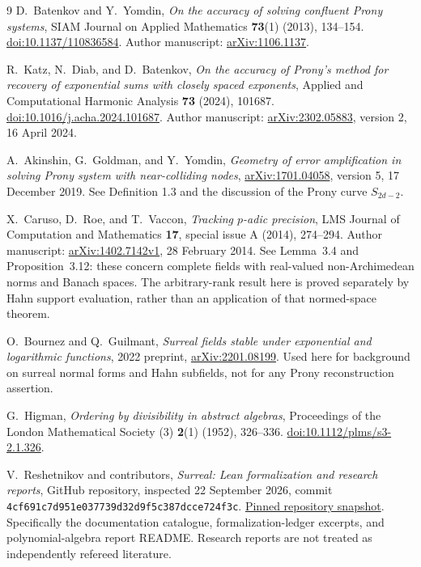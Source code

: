 \documentclass[11pt,letterpaper]{article}
\theoremstyle{definition}
\theoremstyle{remark}
\begin{document}
\begin{thebibliography}{9}
D.~Batenkov and Y.~Yomdin,
\emph{On the accuracy of solving confluent Prony systems},
SIAM Journal on Applied Mathematics \textbf{73}(1) (2013), 134--154.
\href{https://doi.org/10.1137/110836584}{doi:10.1137/110836584}.
Author manuscript: \href{https://arxiv.org/abs/1106.1137}{arXiv:1106.1137}.

R.~Katz, N.~Diab, and D.~Batenkov,
\emph{On the accuracy of Prony's method for recovery of exponential sums
with closely spaced exponents},
Applied and Computational Harmonic Analysis \textbf{73} (2024), 101687.
\href{https://doi.org/10.1016/j.acha.2024.101687}{doi:10.1016/j.acha.2024.101687}.
Author manuscript: \href{https://arxiv.org/abs/2302.05883}{arXiv:2302.05883},
version 2, 16 April 2024.


A.~Akinshin, G.~Goldman, and Y.~Yomdin,
\emph{Geometry of error amplification in solving Prony system with
near-colliding nodes},
\href{https://arxiv.org/abs/1701.04058}{arXiv:1701.04058}, version 5,
17 December 2019. See Definition 1.3 and the discussion of the Prony curve
$S_{2d-2}$.

X.~Caruso, D.~Roe, and T.~Vaccon,
\emph{Tracking $p$-adic precision},
LMS Journal of Computation and Mathematics \textbf{17}, special issue A
(2014), 274--294.
Author manuscript: \href{https://arxiv.org/abs/1402.7142v1}{arXiv:1402.7142v1},
28 February 2014. See Lemma~3.4 and Proposition~3.12: these concern
complete fields with real-valued non-Archimedean norms and Banach spaces.
The arbitrary-rank result here is proved separately by Hahn support
evaluation, rather than an application of that normed-space theorem.

O.~Bournez and Q.~Guilmant,
\emph{Surreal fields stable under exponential and logarithmic functions},
2022 preprint, \href{https://arxiv.org/abs/2201.08199}{arXiv:2201.08199}.
Used here for background on surreal normal forms and Hahn subfields,
not for any Prony reconstruction assertion.

G.~Higman,
\emph{Ordering by divisibility in abstract algebras},
Proceedings of the London Mathematical Society (3) \textbf{2}(1)
(1952), 326--336.
\href{https://doi.org/10.1112/plms/s3-2.1.326}{doi:10.1112/plms/s3-2.1.326}.

V.~Reshetnikov and contributors,
\emph{Surreal: Lean formalization and research reports}, GitHub repository,
inspected 22 September 2026, commit
\texttt{4cf691c7d951e037739d32d9f5c387dcce724f3c}.
\href{https://github.com/VladimirReshetnikov/Surreal/tree/4cf691c7d951e037739d32d9f5c387dcce724f3c}{Pinned repository snapshot}.
Specifically the documentation catalogue, formalization-ledger excerpts,
and polynomial-algebra report README. Research reports are not treated
as independently refereed literature.


\end{thebibliography}
\end{document}

